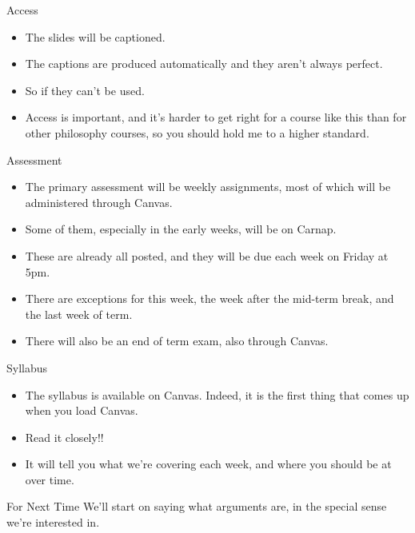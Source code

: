 \documentclass[
  ignorenonframetext,
]{beamer}
\providecommand{\tightlist}{%
  \setlength{\itemsep}{0pt}\setlength{\parskip}{0pt}}
\renewcommand{\,}{\text{, }}
\begin{document}
\begin{frame}{Access}
\protect\hypertarget{access}{}
\begin{itemize}
\tightlist
\item
  The slides will be captioned.
\item
  The captions are produced automatically and they aren't always
  perfect.
\item
  So if they can't be used.
\item
  Access is important, and it's harder to get right for a course like
  this than for other philosophy courses, so you should hold me to a
  higher standard.
\end{itemize}
\end{frame}

\begin{frame}{Assessment}
\protect\hypertarget{assessment}{}
\begin{itemize}
\tightlist
\item
  The primary assessment will be weekly assignments, most of which will
  be administered through Canvas.
\item
  Some of them, especially in the early weeks, will be on Carnap.
\item
  These are already all posted, and they will be due each week on Friday
  at 5pm.
\item
  There are exceptions for this week, the week after the mid-term break,
  and the last week of term.
\item
  There will also be an end of term exam, also through Canvas.
\end{itemize}
\end{frame}

\begin{frame}{Syllabus}
\protect\hypertarget{syllabus}{}
\begin{itemize}
\tightlist
\item
  The syllabus is available on Canvas. Indeed, it is the first thing
  that comes up when you load Canvas.
\item
  Read it closely!!
\item
  It will tell you what we're covering each week, and where you should
  be at over time.
\end{itemize}
\end{frame}

\begin{frame}{For Next Time}
\protect\hypertarget{for-next-time}{}
We'll start on saying what arguments are, in the special sense we're
interested in.
\end{frame}
\end{document}
